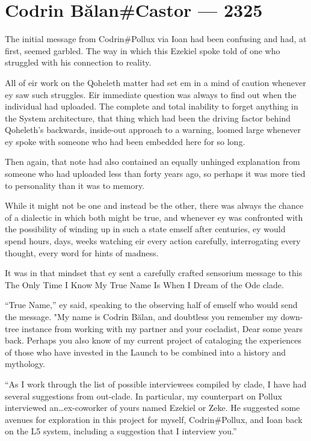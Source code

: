 \hypertarget{codrin-bux103lancastor-2325}{%
\chapter{Codrin Bălan\#Castor — 2325}\label{codrin-bux103lancastor-2325}}

The initial message from Codrin\#Pollux via Ioan had been confusing and had, at first, seemed garbled. The way in which this Ezekiel spoke told of one who struggled with his connection to reality.

All of eir work on the Qoheleth matter had set em in a mind of caution whenever ey saw such struggles. Eir immediate question was always to find out when the individual had uploaded. The complete and total inability to forget anything in the System architecture, that thing which had been the driving factor behind Qoheleth's backwards, inside-out approach to a warning, loomed large whenever ey spoke with someone who had been embedded here for so long.

Then again, that note had also contained an equally unhinged explanation from someone who had uploaded less than forty years ago, so perhaps it was more tied to personality than it was to memory.

While it might not be one and instead be the other, there was always the chance of a dialectic in which both might be true, and whenever ey was confronted with the possibility of winding up in such a state emself after centuries, ey would spend hours, days, weeks watching eir every action carefully, interrogating every thought, every word for hints of madness.

It was in that mindset that ey sent a carefully crafted sensorium message to this The Only Time I Know My True Name Is When I Dream of the Ode clade.

``True Name,'' ey said, speaking to the observing half of emself who would send the message. "My name is Codrin Bălan, and doubtless you remember my down-tree instance from working with my partner and your cocladist, Dear some years back. Perhaps you also know of my current project of cataloging the experiences of those who have invested in the Launch to be combined into a history and mythology.

``As I work through the list of possible interviewees compiled by clade, I have had several suggestions from out-clade. In particular, my counterpart on Pollux interviewed an\ldots ex-coworker of yours named Ezekiel or Zeke. He suggested some avenues for exploration in this project for myself, Codrin\#Pollux, and Ioan back on the L5 system, including a suggestion that I interview you.''

